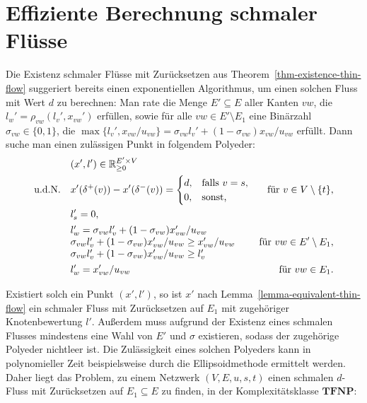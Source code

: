 \section{Effiziente Berechnung schmaler Flüsse}

Die Existenz schmaler Flüsse mit Zurücksetzen aus Theorem~\ref{thm-existence-thin-flow} suggeriert bereits einen exponentiellen Algorithmus, um einen solchen Fluss mit Wert $d$ zu berechnen:
Man rate die Menge $E'\subseteq E$ aller Kanten $vw$, die $l_w' = \rho_{vw}(l_v', x_{vw}')$ erfüllen, sowie für alle $vw\in E'\setminus E_1$ eine Binärzahl $\sigma_{vw}\in\{0,1\}$, die $\max\{ l_v', x_{vw}/u_{vw}\} = \sigma_{vw} l_v' + (1-\sigma_{vw}) x_{vw}/u_{vw}$ erfüllt.
Dann suche man einen zulässigen Punkt in folgendem Polyeder:
\begin{align*}
&	(x', l') \in \R_{\geq 0}^{E'\times V} \\
	\text{u.d.N.}\quad &
	x'(\delta^+(v)) - x'(\delta^-(v)) =
		\begin{cases}
			d, & \text{falls $v=s$},\\
			0, & \text{sonst,} 
		\end{cases} & \text{für $v\in V\setminus\{t \}$,} \\
	& l'_s = 0, \\
	& \begin{array}{@{}l}
		l_w' = \sigma_{vw} l_v' + (1-\sigma_{vw}) x'_{vw}/u_{vw}\\
		\sigma_{vw} l_v' + (1-\sigma_{vw}) x'_{vw}/u_{vw} \geq x'_{vw}/u_{vw}\\
		\sigma_{vw} l_v' + (1-\sigma_{vw}) x'_{vw}/u_{vw} \geq l_v'
	\end{array}
	& \text{für $vw\in E'\setminus E_1$},\\
	& l_w' = x'_{vw}/u_{vw} & \text{für $vw\in E_1$.}
\end{align*}

\newcommand{\TFNP}{\mathbf{TFNP}}

Existiert solch ein Punkt $(x', l')$, so ist $x'$ nach Lemma~\ref{lemma-equivalent-thin-flow} ein schmaler Fluss mit Zurücksetzen auf $E_1$ mit zugehöriger Knotenbewertung $l'$.
Außerdem muss aufgrund der Existenz eines schmalen Flusses mindestens eine Wahl von $E'$ und $\sigma$ existieren, sodass der zugehörige Polyeder nichtleer ist.
Die Zulässigkeit eines solchen Polyeders kann in polynomieller Zeit beispielsweise durch die Ellipsoidmethode ermittelt werden. 
Daher liegt das Problem, zu einem Netzwerk $(V, E, u, s, t)$ einen schmalen $d$-Fluss mit Zurücksetzen auf $E_1\subseteq E$ zu finden, in der Komplexitätsklasse $\TFNP$:

